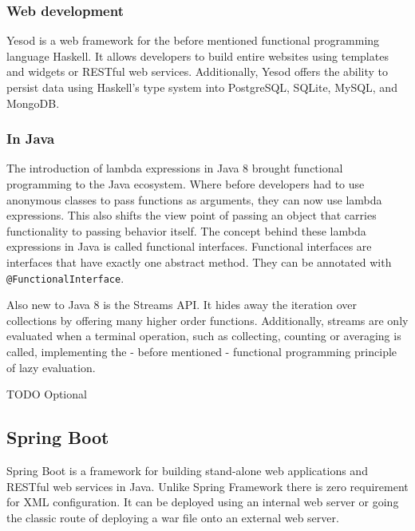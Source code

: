 \documentclass[a4paper]{article}
\begin{document}
\subsubsection{Web development}

Yesod is a web framework for the before mentioned functional programming
language Haskell. It allows developers to build entire websites using templates
and widgets or RESTful web services. Additionally, Yesod offers the ability to
persist data using Haskell's type system into PostgreSQL, SQLite, MySQL, and
MongoDB. \cite{snoyman2015developing}

\subsubsection{In Java}

The introduction of lambda expressions in Java 8 brought functional programming
to the Java ecosystem. Where before developers had to use anonymous classes to
pass functions as arguments, they can now use lambda expressions. This also
shifts the view point of passing an object that carries functionality to passing
behavior itself. The concept behind these lambda expressions in Java is called
functional interfaces. Functional interfaces are interfaces that have exactly
one abstract method. They can be annotated with \verb|@FunctionalInterface|.
\newline

\noindent Also new to Java 8 is the Streams API. It hides away the iteration
over collections by offering many higher order functions. Additionally, streams
are only evaluated when a terminal operation, such as collecting, counting or
averaging is called, implementing the - before mentioned - functional
programming principle of lazy evaluation. \cite{warburton2014java}

TODO Optional

\subsection{Spring Boot}

Spring Boot is a framework for building stand-alone web applications and RESTful
web services in Java. Unlike Spring Framework there is zero requirement for XML
configuration. It can be deployed using an internal web server or going the
classic route of deploying a war file onto an external web server.
\cite{webb2013spring}
\end{document}
